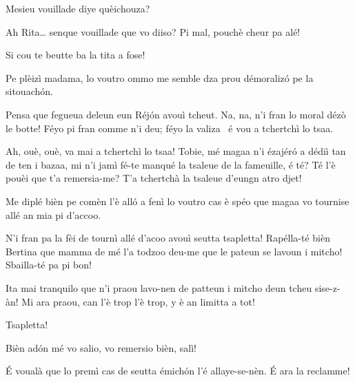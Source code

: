 \begin{drama}
\Ritaspeaks {} Mesieu vouillade diye quèichouza?

\Tobiespeaks Ah Rita\ldots {} senque vouillade que vo diiso? Pi mal, pouchè cheur pa alé!

\Bertinaspeaks Si cou te beutte ba la tita a fose!

\Ritaspeaks Pe plèizì madama, lo voutro ommo me semble dza prou démoralizó pe la sitouachón.

\Tobiespeaks Pensa que fegueua deleun eun Réjón avouì tcheut. Na, na, n’i fran lo moral dézò le botte! Féyo pi fran comme n’i deu; féyo la valiza \valigia\ é vou a tchertchì lo tsaa.

\Bertinaspeaks Ah, ouè, ouè, va mai a tchertchì lo tsaa! Tobie, mé magaa n’i ézajéró a dédiì tan de ten i bazaa, mi n’i jamì fé-te manqué la tsaleue de la fameuille, é té? Té l’è pouèi que t’a remersia-me? T’a tchertchà la tsaleue d’eungn atro djet!

\Ritaspeaks Me diplé bièn pe comèn l’è alló a fenì lo voutro cas è spéo que magaa vo tournise allé an mia pi d’accoo.

\Tobiespeaks N’i fran pa la fèi de tournì allé d’acoo avouì seutta tsapletta! Rapélla-té bièn Bertina que mamma de mé l’a todzoo deu-me que le pateun se lavoun i mitcho! Sbailla-té pa pi bon!

\Bertinaspeaks Ita mai tranquilo que n’i praou lavo-nen de patteun i mitcho deun tcheu sise-z-àn! Mi ara praou, can l’è trop l’è trop, y è an limitta a tot!

\Tobiespeaks Tsapletta!

\Ritaspeaks Bièn ad\'on mé vo salio, vo remersio bièn, salì!


\Ritaspeaks É voualà que lo premì cas de seutta émichón l'é allaye-se-nèn. \'E ara la reclamme!




\end{drama}
